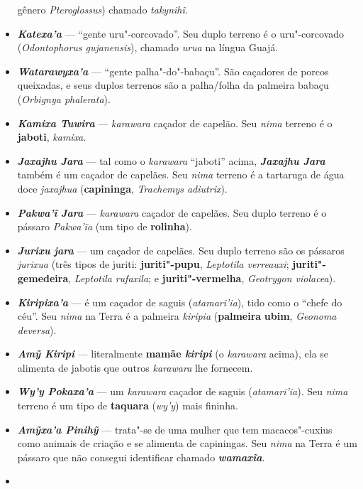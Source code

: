\begin{itemize}
  gênero \emph{Pteroglossus}) chamado \emph{takynihĩ}.
\item
  \emph{\textbf{Katexa'a}} --- ``gente uru"-corcovado''. Seu duplo terreno
  é o uru"-corcovado (\emph{Odontophorus gujanensis}), chamado
  \emph{urua} na língua Guajá.
\item
  \emph{\textbf{Watarawyxa'a}} --- ``gente palha"-do"-babaçu''. São
  caçadores de porcos queixadas, e seus duplos terrenos são a
  palha/folha da palmeira babaçu (\emph{Orbignya phalerata}).
\item
  \textbf{\emph{Kamixa Tuwira}} --- \emph{karawara} caçador de capelão.
  Seu \emph{nima} terreno é o \textbf{jaboti}, \emph{kamixa}.
\item
  \emph{\textbf{Jaxajhu Jara}} --- tal como o \emph{karawara} ``jaboti''
  acima, \emph{\textbf{Jaxajhu Jara}} também é um caçador de capelães.
  Seu \emph{nima} terreno é a tartaruga de água doce \emph{jaxajhua}
  (\textbf{capininga}, \emph{Trachemys adiutrix}).
\item
  \textbf{\emph{Pakwa'ĩ} \emph{Jara}} --- \emph{karawara} caçador de
  capelães. Seu duplo terreno é o pássaro \emph{Pakwa'ĩa} (um tipo de
  \textbf{rolinha}).
\item
  \textbf{\emph{Jurixu} \emph{jara}} --- um caçador de capelães. Seu duplo
  terreno são os pássaros \emph{jurixua} (três tipos de juriti:
  \textbf{juriti"-pupu}, \emph{Leptotila verreauxi};
  \textbf{juriti"-gemedeira}, \emph{Leptotila} \emph{rufaxila}; e
  \textbf{juriti"-vermelha}, \emph{Geotrygon violacea}).
\item
  \emph{\textbf{Kiripixa'a}} --- é um caçador de saguis
  (\emph{atamari'ia}), tido como o ``chefe do céu''. Seu \emph{nima} na
  Terra é a palmeira \emph{kiripia} (\textbf{palmeira} \textbf{ubim},
  \emph{Geonoma deversa}).
\item
  \emph{\textbf{Amỹ Kiripi}} --- literalmente \textbf{mamãe \emph{kiripi}}
  (o \emph{karawara} acima), ela se alimenta de jabotis que outros
  \emph{karawara} lhe fornecem.
\item
  \emph{\textbf{Wy'y Pokaxa'a}} --- um \emph{karawara} caçador de saguis
  (\emph{atamari'ia}). Seu \emph{nima} terreno é um tipo de
  \textbf{taquara} (\emph{wy'y}) mais fininha.
\item
  \emph{\textbf{Amỹxa'a Pinihỹ}} --- trata"-se de uma mulher que tem
  macacos"-cuxius como animais de criação e se alimenta de capiningas.
  Seu \emph{nima} na Terra é um pássaro que não consegui identificar
  chamado \emph{\textbf{wamaxĩa}}.
\item

\end{itemize}
